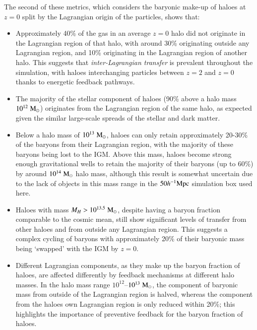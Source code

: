 The second of these metrics, which considers the baryonic make-up of haloes
at $z=0$ split by the Lagrangian origin of the particles, shows that:
\begin{itemize}
    \item Approximately 40\% of the gas in an average $z=0$ halo did not originate
          in the Lagrangian region of that halo, with around 30\% originating
          outside any Lagrangian region, and 10\% originating in the Lagrangian
          region of another halo. This suggests that \emph{inter-Lagrangian
          transfer} is prevalent throughout the simulation, with haloes interchanging
          particles between $z=2$ and $z=0$ thanks to energetic feedback pathways.
    \item The majority of the stellar component of haloes (90\% above a halo mass
          $10^{12}\;{\rm M}_{\odot}{}$) originates from the Lagrangian region of the
          same halo, as expected given the similar large-scale spreads of the
          stellar and dark matter.
    \item Below a halo mass of $10^{13}\;{\rm M}_{\odot}{}$, haloes can only retain
          approximately 20-30\% of the baryons from their Lagrangian region,
          with the majority of these baryons being lost to the IGM. Above
          this mass, haloes become strong enough gravitational wells to
          retain the majority of their baryons (up to 60\%) by around
          $10^{14}\;{\rm M}_{\odot}{}$ halo mass, although this result is somewhat
          uncertain due to the lack of objects in this mass range in the
          $50h^{-1}{\rm Mpc}{}$ simulation box used here.
    \item Haloes with mass $M_H > 10^{13.5}\;{\rm M}_{\odot}{}$, despite having a baryon
          fraction comparable to the cosmic mean, still show significant
          levels of transfer from other haloes and from outside any
          Lagrangian region. This suggests a complex cycling of baryons with
          approximately 20\% of their baryonic mass being `swapped' with the
          IGM by $z=0$.
    \item Different Lagrangian components, as they make up the baryon
          fraction of haloes, are affected differently by feedback mechanisms
          at different halo masses. In the halo mass range
          $10^{12}$--$10^{13}\;{\rm M}_{\odot}{}$, the component of baryonic mass from
          outside of the Lagrangian region is halved, whereas the component
          from the haloes own Lagrangian region is only reduced within 20\%;
          this highlights the importance of preventive feedback for the
          baryon fraction of haloes.
\end{itemize}

